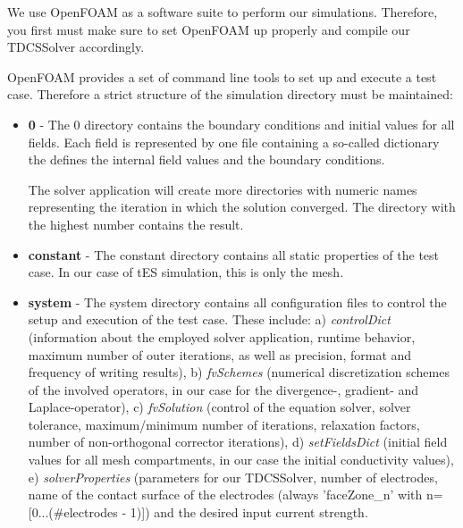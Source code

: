 We use OpenFOAM as a software suite to perform our simulations. Therefore, you first must make sure
to set OpenFOAM up properly and compile our TDCSSolver accordingly.\par
OpenFOAM provides a set of command line tools to set up and execute a test case. Therefore a strict
structure of the simulation directory must be maintained:
\begin{itemize}
    \item \textbf{0} - The 0 directory contains the boundary conditions and initial values for all fields.
                       Each field is represented by one file containing a so-called dictionary the defines
                       the internal field values and the boundary conditions.\par
                       The solver application will create more directories with numeric names representing
                       the iteration in which the solution converged. The directory with the highest number
                       contains the result.
    \item \textbf{constant} - The constant directory contains all static properties of the test case. In our
                              case of tES simulation, this is only the mesh.
    \item \textbf{system} - The system directory contains all configuration files to control the setup and
                            execution of the test case. These include: a) \emph{controlDict} (information about the
                            employed solver application, runtime behavior, maximum number of outer iterations,
                            as well as precision, format and frequency of writing results), b) \emph{fvSchemes}
                            (numerical discretization schemes of the involved operators, in our case for the divergence-,
                            gradient- and Laplace-operator), c) \emph{fvSolution} (control of the equation solver,
                            solver tolerance, maximum/minimum number of iterations, relaxation factors, number
                            of non-orthogonal corrector iterations), d) \emph{setFieldsDict} (initial field values
                            for all mesh compartments, in our case the initial conductivity values), e)
                            \emph{solverProperties} (parameters for our TDCSSolver, number of electrodes, name of
                            the contact surface of the electrodes (always 'faceZone\_n' with 
                            n=[0...(\#electrodes - 1)]) and the desired input current strength. 
\end{itemize}

